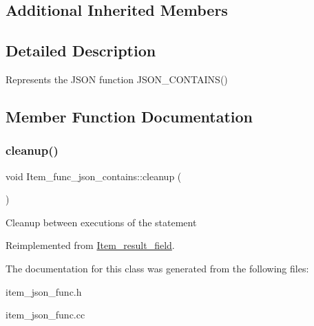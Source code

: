 \subsection*{Additional Inherited Members}


\subsection{Detailed Description}
Represents the J\+S\+ON function J\+S\+O\+N\+\_\+\+C\+O\+N\+T\+A\+I\+N\+S() 

\subsection{Member Function Documentation}
\mbox{\label{classItem__func__json__contains_a9a8d40725abf7916c5e194c634edc27a}} 
\subsubsection{\texorpdfstring{cleanup()}{cleanup()}}
{\footnotesize\ttfamily void Item\+\_\+func\+\_\+json\+\_\+contains\+::cleanup (\begin{DoxyParamCaption}{ }\end{DoxyParamCaption})\hspace{0.3cm}{\ttfamily [virtual]}}

Cleanup between executions of the statement 

Reimplemented from \mbox{\hyperlink{classItem__result__field}{Item\+\_\+result\+\_\+field}}.



The documentation for this class was generated from the following files\+:\begin{DoxyCompactItemize}
\item 
item\+\_\+json\+\_\+func.\+h\item 
item\+\_\+json\+\_\+func.\+cc\end{DoxyCompactItemize}
